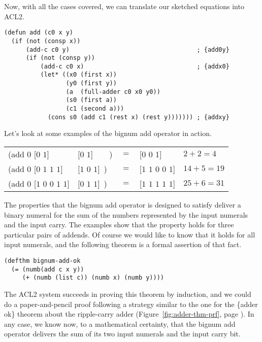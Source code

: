 Now, with all the cases covered, we can translate our sketched equations
into ACL2.

\label{bignum-add-defun}
\begin{Verbatim}
(defun add (c0 x y)
  (if (not (consp x))
      (add-c c0 y)                                   ; {add0y}
      (if (not (consp y))
          (add-c c0 x)                               ; {addx0}
          (let* ((x0 (first x))
                 (y0 (first y))
                 (a  (full-adder c0 x0 y0))
                 (s0 (first a))
                 (c1 (second a)))
            (cons s0 (add c1 (rest x) (rest y))))))) ; {addxy}
\end{Verbatim}

Let's look at some examples of the bignum add operator in action.
\begin{center}
\begin{tabular}{lllll}
(add $0$ [$0$ $1$]             &[$0$ $1$]~~~~)  &$=$ &[$0$ $0$ 1]           & $2 + 2 = 4$   \\
(add $0$ [$0$ $1$ $1$ $1$]     &[$1$ $0$ $1$]~) &$=$ &[$1$ $1$ $0$ $0$ $1$] & $14 + 5 = 19$ \\
(add $0$ [$1$ $0$ $0$ $1$ $1$] &[$0$ $1$ $1$]~) &$=$ &[$1$ $1$ $1$ $1$ $1$] & $25 + 6 = 31$ \\
\end{tabular}
\end{center}

The properties that the bignum add operator is designed to satisfy
deliver a binary numeral for the sum of
the numbers represented by the input numerals and the input carry.
The examples show that the property holds for three
particular pairs of addends.
Of course we would like to know that it
holds for all input numerals, and
the following theorem is a formal assertion of that fact.

\label{bignum-adder-thm}
\begin{Verbatim}
(defthm bignum-add-ok
  (= (numb(add c x y))
     (+ (numb (list c)) (numb x) (numb y))))
\end{Verbatim}

The ACL2 system succeeds in proving this theorem by induction,
and we could do a paper-and-pencil proof following a strategy
similar to the one for the \{adder ok\} theorem about the ripple-carry adder
(Figure~\ref{fig:adder-thm-prf}, page \pageref{fig:adder-thm-prf}).
In any case, we know now, to a mathematical certainty,
that the bignum add operator delivers
the sum of its two input numerals and the input carry bit.


